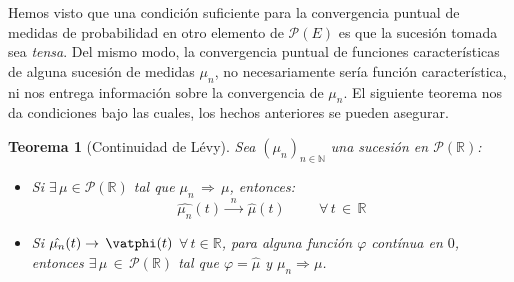 \documentclass[a4paper]{article}
\newtheorem{teorema}{Teorema}
\numberwithin{equation}{subsection}
\numberwithin{definicion}{subsection}
\def\R{\mathbb R}
\def\N{\mathbb N}
\begin{document}
Hemos visto que una condición suficiente para la convergencia puntual de medidas de probabilidad en otro elemento de $\mathcal{P}(E)$ es que la sucesión tomada sea \textit{tensa}. Del mismo modo, la convergencia puntual de funciones características de alguna sucesión de medidas $\mu_n$, no necesariamente sería función característica, ni nos entrega información sobre la convergencia de $\mu_n$. El siguiente teorema nos da condiciones bajo las cuales, los hechos anteriores se pueden asegurar.\\ \newline
\begin{teorema}[Continuidad de Lévy] Sea $(\mu_n)_{n\in\N}$ una sucesión en $\mathcal{P}(\R)$:
\begin{itemize}
    \item[i)] Si $\exists\,\mu\in\mathcal{P}(\R)$ tal que $\mu_n\,\Rightarrow\,\mu$, entonces:
    \[\hat{\mu_n}(t)\xrightarrow{\,\,\,n\,\,\,}\,\hat{\mu}(t) \hspace{1cm} \forall \, t \,\in\,\R\]
    \item[ii)] Si $\hat{\mu_n}(t)\rightarrow\,\vatphi(t)$ $\forall\,t\in\R$, para alguna función $\varphi$ contínua en $0$, entonces $\exists\,\mu\,\in\,\mathcal{P}(\R)$ tal que $\varphi = \hat{\mu}$ y $\mu_n \Rightarrow\mu$.
\end{itemize}
\end{teorema}
\\ \newline
\end{document}
